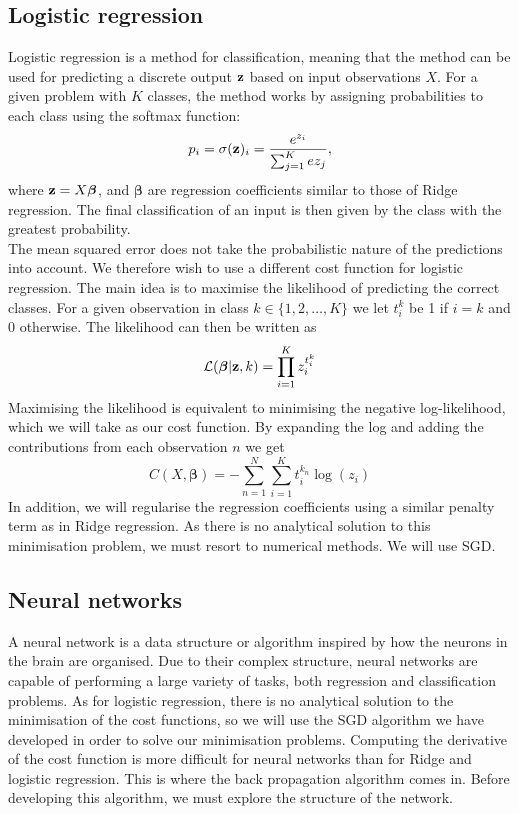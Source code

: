 \documentclass[notitlepage, reprint, nofootinbib]{revtex4-1}
\begin{document}
\subsection{Logistic regression}
Logistic regression is a method for classification, meaning that the method can be used for predicting a discrete output $\vb{z}$ based on input observations $X$. For a given problem with $K$ classes, the method works by assigning probabilities to each class using the softmax function: 
\begin{equation}p_i=\sigma(\vb{z})_i = \frac{e^{z_i}}{\sum_{j=1}^K e{z_j}},\end{equation}
where $\vb{z}=X\boldsymbol{\beta}$, and $\boldsymbol{\beta}$ are regression coefficients similar to those of Ridge regression. The final classification of an input is then given by the class with the greatest probability. \\[2mm]
The mean squared error does not take the probabilistic nature of the predictions into account. We therefore wish to use a different cost function for logistic regression. The main idea is to maximise the likelihood of predicting the correct classes. For a given observation in class $k\in \{1,2,\dots, K\}$ we let $t_i^k$ be 1 if $i=k$ and 0 otherwise. The likelihood can then be written as 
\begin{equation}\mathcal{L}(\boldsymbol{\beta}|\vb{z},k)=\prod_{i=1}^K z_i^{t_i^k}\end{equation}
Maximising the likelihood is equivalent to minimising the negative log-likelihood, which we will take as our cost function. By expanding the log and adding the contributions from each observation $n$ we get   
\begin{equation}C(X, \boldsymbol{\beta})=-\sum_{n=1}^N \sum_{i=1}^K t_i^{k_n}  \log (z_i)\end{equation}
In addition, we will regularise the regression coefficients using a similar penalty term as in Ridge regression. As there is no analytical solution to this minimisation problem, we must resort to numerical methods. We will use SGD.  

\subsection{Neural networks}
A neural network is a data structure or algorithm inspired by how the neurons in the brain are organised. \cite{snl_NN} Due to their complex structure, neural networks are capable of performing a large variety of tasks, both regression and classification problems. As for logistic regression, there is no analytical solution to the minimisation of the cost functions, so we will use the SGD algorithm we have developed in order to solve our minimisation problems. Computing the derivative of the cost function is more difficult for neural networks than for Ridge and logistic regression. This is where the back propagation algorithm comes in. Before developing this algorithm, we must explore the structure of the network.   
\end{document}
